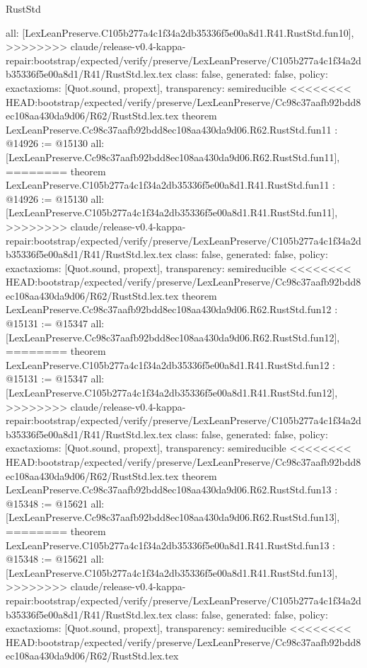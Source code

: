 \begin{lexlean}{RustStd}
\begin{coremodule}
{\begin{coremodule}
{{{{{{{{{{{{{{  all: [LexLeanPreserve.C105b277a4c1f34a2db35336f5e00a8d1.R41.RustStd.fun10],
>>>>>>>> claude/release-v0.4-kappa-repair:bootstrap/expected/verify/preserve/LexLeanPreserve/C105b277a4c1f34a2db35336f5e00a8d1/R41/RustStd.lex.tex
  class: false,
  generated: false,
  policy: exact{axioms: [Quot.sound, propext]},
  transparency: semireducible
}
<<<<<<<< HEAD:bootstrap/expected/verify/preserve/LexLeanPreserve/Cc98c37aafb92bdd8ec108aa430da9d06/R62/RustStd.lex.tex
theorem LexLeanPreserve.Cc98c37aafb92bdd8ec108aa430da9d06.R62.RustStd.fun11 : @14926 := @15130 {
  all: [LexLeanPreserve.Cc98c37aafb92bdd8ec108aa430da9d06.R62.RustStd.fun11],
========
theorem LexLeanPreserve.C105b277a4c1f34a2db35336f5e00a8d1.R41.RustStd.fun11 : @14926 := @15130 {
  all: [LexLeanPreserve.C105b277a4c1f34a2db35336f5e00a8d1.R41.RustStd.fun11],
>>>>>>>> claude/release-v0.4-kappa-repair:bootstrap/expected/verify/preserve/LexLeanPreserve/C105b277a4c1f34a2db35336f5e00a8d1/R41/RustStd.lex.tex
  class: false,
  generated: false,
  policy: exact{axioms: [Quot.sound, propext]},
  transparency: semireducible
}
<<<<<<<< HEAD:bootstrap/expected/verify/preserve/LexLeanPreserve/Cc98c37aafb92bdd8ec108aa430da9d06/R62/RustStd.lex.tex
theorem LexLeanPreserve.Cc98c37aafb92bdd8ec108aa430da9d06.R62.RustStd.fun12 : @15131 := @15347 {
  all: [LexLeanPreserve.Cc98c37aafb92bdd8ec108aa430da9d06.R62.RustStd.fun12],
========
theorem LexLeanPreserve.C105b277a4c1f34a2db35336f5e00a8d1.R41.RustStd.fun12 : @15131 := @15347 {
  all: [LexLeanPreserve.C105b277a4c1f34a2db35336f5e00a8d1.R41.RustStd.fun12],
>>>>>>>> claude/release-v0.4-kappa-repair:bootstrap/expected/verify/preserve/LexLeanPreserve/C105b277a4c1f34a2db35336f5e00a8d1/R41/RustStd.lex.tex
  class: false,
  generated: false,
  policy: exact{axioms: [Quot.sound, propext]},
  transparency: semireducible
}
<<<<<<<< HEAD:bootstrap/expected/verify/preserve/LexLeanPreserve/Cc98c37aafb92bdd8ec108aa430da9d06/R62/RustStd.lex.tex
theorem LexLeanPreserve.Cc98c37aafb92bdd8ec108aa430da9d06.R62.RustStd.fun13 : @15348 := @15621 {
  all: [LexLeanPreserve.Cc98c37aafb92bdd8ec108aa430da9d06.R62.RustStd.fun13],
========
theorem LexLeanPreserve.C105b277a4c1f34a2db35336f5e00a8d1.R41.RustStd.fun13 : @15348 := @15621 {
  all: [LexLeanPreserve.C105b277a4c1f34a2db35336f5e00a8d1.R41.RustStd.fun13],
>>>>>>>> claude/release-v0.4-kappa-repair:bootstrap/expected/verify/preserve/LexLeanPreserve/C105b277a4c1f34a2db35336f5e00a8d1/R41/RustStd.lex.tex
  class: false,
  generated: false,
  policy: exact{axioms: [Quot.sound, propext]},
  transparency: semireducible
}
<<<<<<<< HEAD:bootstrap/expected/verify/preserve/LexLeanPreserve/Cc98c37aafb92bdd8ec108aa430da9d06/R62/RustStd.lex.tex
}}}}}}}}}}}}}}}}
\end{coremodule}}
\end{coremodule}
\end{lexlean}
